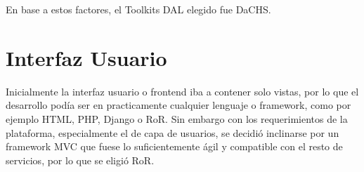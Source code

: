 \documentclass[10pt]{article}
\begin{document}
\vspace{0.5cm} En base a estos factores, el Toolkits DAL elegido fue DaCHS.

\section{Interfaz Usuario}
Inicialmente la interfaz usuario o frontend iba a contener solo vistas, por lo que el desarrollo podía ser en practicamente cualquier lenguaje o framework, como por ejemplo HTML, PHP, Django o RoR. Sin embargo con los requerimientos de la plataforma, especialmente el de capa de usuarios, se decidió inclinarse por un framework MVC que fuese lo suficientemente ágil y compatible con el resto de servicios, por lo que se eligió RoR.
\end{document}
